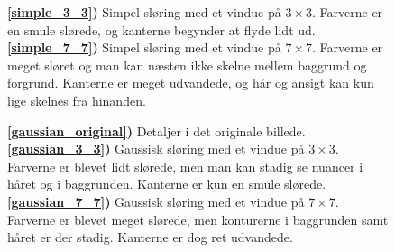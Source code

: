 {\begin{figure}[!h]
{        \textbf{\ref{simple_3_3})} Simpel sløring med et vindue på $3\times{}3$.
        Farverne er en smule slørede, og kanterne begynder at flyde lidt ud.
        \textbf{\ref{simple_7_7})} Simpel sløring med et vindue på $7\times{}7$.
        Farverne er meget sløret og man kan næsten ikke skelne mellem
        baggrund og forgrund. Kanterne er meget udvandede, og hår og
        ansigt kan kun lige skelnes fra hinanden.
    }
    \label{simple_metode}
\end{figure}
\begin{figure}[!h]
    \centering
    \hspace{1em}
    \hspace{1em}
    \caption[]{
        \textbf{\ref{gaussian_original})} Detaljer i det originale billede.
        \textbf{\ref{gaussian_3_3})} Gaussisk sløring med et vindue på
        $3\times{}3$. Farverne er blevet lidt slørede, men man kan
        stadig se nuancer i håret og i baggrunden. Kanterne er kun en
        smule slørede.
        \textbf{\ref{gaussian_7_7})} Gaussisk sløring med et vindue på
        $7\times{}7$. Farverne er blevet meget slørede, men konturerne i
        baggrunden samt håret er der stadig. Kanterne er dog ret udvandede.
    }
    \label{gaussian_metode}
\end{figure}

}
